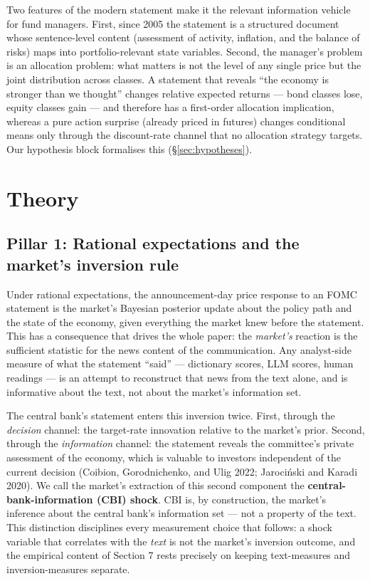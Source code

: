 \documentclass[11pt]{article}
\begin{document}
Two features of the modern statement make it the relevant information vehicle
for fund managers. First, since 2005 the statement is a structured document
whose sentence-level content (assessment of activity, inflation, and the
balance of risks) maps into portfolio-relevant state variables. Second, the
manager's problem is an allocation problem: what matters is not the level of
any single price but the joint distribution across classes. A statement that
reveals ``the economy is stronger than we thought'' changes relative expected
returns --- bond classes lose, equity classes gain --- and therefore has a
first-order allocation implication, whereas a pure action surprise (already
priced in futures) changes conditional means only through the discount-rate
channel that no allocation strategy targets. Our hypothesis block formalises
this (\S\ref{sec:hypotheses}).

\section{Theory}

\subsection{Pillar 1: Rational expectations and the market's inversion rule}\label{pillar-1-rational-expectations-and-the-markets-inversion-rule}

Under rational expectations, the announcement-day price response to an FOMC statement is the market's Bayesian posterior update about the policy path and the state of the economy, given everything the market knew before the statement. This has a consequence that drives the whole paper: the \emph{market's} reaction is the sufficient statistic for the news content of the communication. Any analyst-side measure of what the statement ``said'' --- dictionary scores, LLM scores, human readings --- is an attempt to reconstruct that news from the text alone, and is informative about the text, not about the market's information set.

The central bank's statement enters this inversion twice. First, through the \emph{decision} channel: the target-rate innovation relative to the market's prior. Second, through the \emph{information} channel: the statement reveals the committee's private assessment of the economy, which is valuable to investors independent of the current decision (Coibion, Gorodnichenko, and Ulig 2022; Jarociński and Karadi 2020). We call the market's extraction of this second component the \textbf{central-bank-information (CBI) shock}. CBI is, by construction, the market's inference about the central bank's information set --- not a property of the text. This distinction disciplines every measurement choice that follows: a shock variable that correlates with the \emph{text} is not the market's inversion outcome, and the empirical content of Section 7 rests precisely on keeping text-measures and inversion-measures separate.
\end{document}
